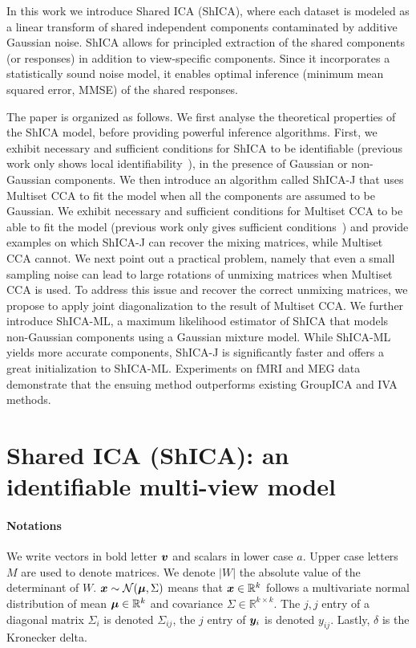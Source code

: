 In this work we introduce Shared ICA (ShICA), where each dataset is modeled as a linear transform of shared independent components contaminated by additive Gaussian noise. ShICA allows for principled extraction of the shared components (or responses) in addition to view-specific components. 
%
Since it incorporates a statistically sound noise model, it enables optimal inference (minimum mean squared error, MMSE) of the shared responses.

The paper is organized as follows.
We first analyse the theoretical properties of the ShICA model, before providing powerful inference algorithms.
First, we exhibit necessary and sufficient conditions for ShICA to be identifiable (previous work only shows local identifiability~\cite{anderson2014independent}), in the presence of Gaussian or non-Gaussian components. 
%
We then introduce an algorithm called ShICA-J that uses Multiset CCA to fit the model when all the components are assumed to be Gaussian. We exhibit necessary and sufficient conditions for Multiset CCA to be able to fit the model (previous work only gives sufficient conditions~\cite{li2009joint}) and provide examples on which ShICA-J can recover the mixing matrices, while Multiset CCA cannot. 
%
We next point out a practical problem, namely that even a small sampling noise can lead to large rotations of unmixing matrices when Multiset CCA is used. To address this issue and recover the correct unmixing matrices, we propose to apply joint diagonalization to the result of Multiset CCA.
%
We further introduce ShICA-ML, a maximum likelihood estimator of ShICA that models non-Gaussian components using a Gaussian mixture model. 
%
While ShICA-ML yields more accurate components, ShICA-J is significantly faster and offers a great initialization to ShICA-ML.
Experiments on fMRI and MEG data demonstrate that the ensuing method outperforms existing GroupICA and IVA methods.


\section{Shared ICA (ShICA): an identifiable multi-view model}
\paragraph{Notations} We write vectors in bold letter $\boldsymbol{v}$ and scalars in lower case $a$. Upper case letters $M$ are used to denote
matrices. We denote $|W|$ the absolute value of the determinant of $W$. $\boldsymbol{x} \sim \mathcal{N}(\boldsymbol{\mu}, \Sigma)$ means that $\boldsymbol{x} \in \mathbb{R}^k$ follows
a multivariate normal distribution of mean $\boldsymbol{\mu} \in \mathbb{R}^k$ and
covariance $\Sigma \in \mathbb{R}^{k \times k}$. The $j, j$ entry of a diagonal matrix $\Sigma_i$ is denoted $\Sigma_{ij}$, the $j$ entry of $\boldsymbol{y}_i$ is denoted $y_{ij}$. Lastly, $\delta$ is the Kronecker delta.

